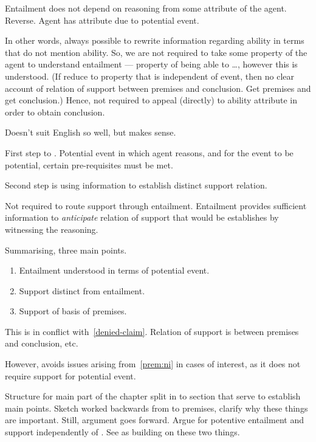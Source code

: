 \begin{note}
  Entailment does not depend on reasoning from some attribute of the agent.
  Reverse.
  Agent has attribute due to potential event.

  In other words, always possible to rewrite information regarding ability in terms that do not mention ability.
  So, we are not required to take some property of the agent to understand entailment --- property of being able to \dots, however this is understood.
  (If reduce to property that is independent of event, then no clear account of relation of support between premises and conclusion.
  Get premises and get conclusion.)
  Hence, not required to appeal (directly) to ability attribute in order to obtain conclusion.

  Doesn't suit English so well, but makes sense.

  First step to \WR{}.
  Potential event in which agent reasons, and for the event to be potential, certain pre-requisites must be met.

  Second step is using information to establish distinct support relation.

  Not required to route support through entailment.
  Entailment provides sufficient information to \emph{anticipate} relation of support that would be establishes by witnessing the reasoning.

  Summarising, three main points.
  \begin{enumerate}
  \item Entailment understood in terms of potential event.
  \item Support distinct from entailment.
  \item Support of basis of premises.
  \end{enumerate}

  This is in conflict with~\ref{denied-claim}.
  Relation of support is between premises and conclusion, etc.

  However, avoids issues arising from~\ref{prem:ni} in cases of interest, as it does not require support for potential event.

  Structure for main part of the chapter split in to section that serve to establish main points.
  Sketch worked backwards from \WR{} to premises, clarify why these things are important.
  Still, argument goes forward.
  Argue for potentive entailment and support independently of \WR{}.
  See \WR{} as building on these two things.
\end{note}


